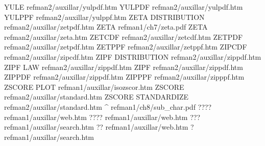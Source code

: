 YULE                                    refman2/auxillar/yulpdf.htm
YULPDF                                  refman2/auxillar/yulpdf.htm
YULPPF                                  refman2/auxillar/yulppf.htm
ZETA DISTRIBUTION                       refman2/auxillar/zetpdf.htm
ZETA                                    refman1/ch7/zeta.pdf
ZETA                                    refman2/auxillar/zeta.htm
ZETCDF                                  refman2/auxillar/zetcdf.htm
ZETPDF                                  refman2/auxillar/zetpdf.htm
ZETPPF                                  refman2/auxillar/zetppf.htm
ZIPCDF                                  refman2/auxillar/zipcdf.htm
ZIPF DISTRIBUTION                       refman2/auxillar/zippdf.htm
ZIPF LAW                                refman2/auxillar/zippdf.htm
ZIPF                                    refman2/auxillar/zippdf.htm
ZIPPDF                                  refman2/auxillar/zippdf.htm
ZIPPPF                                  refman2/auxillar/zipppf.htm
ZSCORE PLOT                             refman1/auxillar/isozscor.htm
ZSCORE                                  refman2/auxillar/standard.htm
ZSCORE STANDARDIZE                      refman2/auxillar/standard.htm
^                                       refman1/ch8/sub_char.pdf
????                                    refman1/auxillar/web.htm
????                                    refman1/auxillar/web.htm
???                                     refman1/auxillar/search.htm
??                                      refman1/auxillar/web.htm
?                                       refman1/auxillar/search.htm

